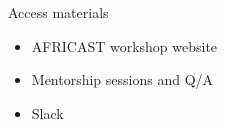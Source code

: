 \documentclass[
  14pt,
  ignorenonframetext,
  aspectratio=169,
]{beamer}
\providecommand{\tightlist}{%
  \setlength{\itemsep}{0pt}\setlength{\parskip}{0pt}}\usepackage{longtable,booktabs,array}
\begin{document}
\begin{frame}{Access materials}
\protect\hypertarget{access-materials}{}
\begin{itemize}
\tightlist
\item
  AFRICAST workshop website
\item
  Mentorship sessions and Q/A
\item
  Slack
\end{itemize}
\end{frame}
\end{document}

